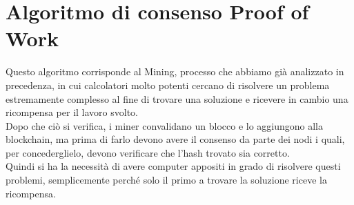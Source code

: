 \documentclass[a4paper,11pt]{report}
\begin{document}
\section{Algoritmo di consenso Proof of Work}
Questo algoritmo corrisponde al Mining, processo che abbiamo già analizzato in precedenza, in cui calcolatori molto potenti cercano di risolvere un problema estremamente complesso al fine di trovare una soluzione e ricevere in cambio una ricompensa per il lavoro svolto.\\
Dopo che ciò si verifica, i miner convalidano un blocco e lo aggiungono alla blockchain, ma prima di farlo devono avere il consenso da parte dei nodi i quali, per concederglielo, devono verificare che l'hash trovato sia corretto.\\
Quindi si ha la necessità di avere computer appositi in grado di risolvere questi problemi, semplicemente perché solo il primo a trovare la soluzione riceve la ricompensa. 
\end{document}
